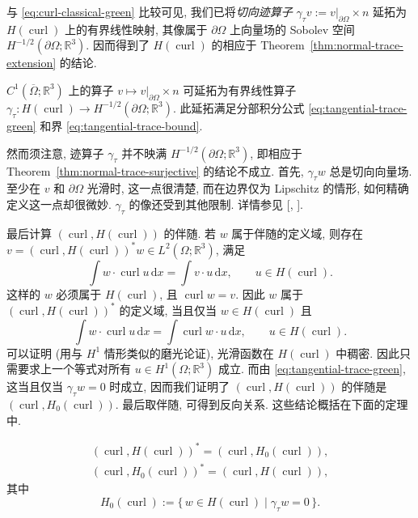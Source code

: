 与 \eqref{eq:curl-classical-green} 比较可见, 我们已将\emph{切向迹算子} $\gamma_\tau v:=v|_{\partial\Omega}\times n$ 延拓为 $H(\operatorname{curl})$ 上的有界线性映射, 其像属于 $\partial\Omega$ 上向量场的 Sobolev 空间 $H^{-1/2}(\partial\Omega;\mathbb R^3)$. 因而得到了 $H(\operatorname{curl})$ 的相应于 Theorem~\ref{thm:normal-trace-extension} 的结论.

\begin{Theorem}\label{thm:tangential-trace-extension}
$C^1(\overline\Omega;\mathbb R^3)$ 上的算子 $v\mapsto v|_{\partial\Omega}\times n$ 可延拓为有界线性算子 $\gamma_\tau:H(\operatorname{curl})\to H^{-1/2}(\partial\Omega;\mathbb R^3)$. 此延拓满足分部积分公式 \eqref{eq:tangential-trace-green} 和界 \eqref{eq:tangential-trace-bound}.
\end{Theorem}

然而须注意, 迹算子 $\gamma_\tau$ 并不映满 $H^{-1/2}(\partial\Omega;\mathbb R^3)$, 即相应于 Theorem~\ref{thm:normal-trace-surjective} 的结论不成立. 首先, $\gamma_\tau w$ 总是切向向量场. 至少在 $v$ 和 $\partial\Omega$ 光滑时, 这一点很清楚, 而在边界仅为 Lipschitz 的情形, 如何精确定义这一点却很微妙. $\gamma_\tau$ 的像还受到其他限制. 详情参见 [, ].

最后计算 $(\operatorname{curl},H(\operatorname{curl}))$ 的伴随. 若 $w$ 属于伴随的定义域, \newline 则存在 $v=(\operatorname{curl},H(\operatorname{curl}))^*w\in L^2(\Omega;\mathbb R^3)$, 满足
\[
\int w\cdot\operatorname{curl}u\,\mathrm{d}x=\int v\cdot u\,\mathrm{d}x,\qquad u\in H(\operatorname{curl}).
\]
这样的 $w$ 必须属于 $H(\operatorname{curl})$, 且 $\operatorname{curl}w=v$. 因此 $w$ 属于 $(\operatorname{curl},H(\operatorname{curl}))^*$ 的定义域, 当且仅当 $w\in H(\operatorname{curl})$ 且
\[
\int w\cdot\operatorname{curl}u\,\mathrm{d}x=\int\operatorname{curl}w\cdot u\,\mathrm{d}x,\qquad u\in H(\operatorname{curl}).
\]
可以证明 (用与 $H^1$ 情形类似的磨光论证), 光滑函数在 $H(\operatorname{curl})$ 中稠密. 因此只需要求上一个等式对所有 $u\in H^1(\Omega;\mathbb R^3)$ 成立. 而由 \eqref{eq:tangential-trace-green}, 这当且仅当 $\gamma_\tau w=0$ 时成立, 因而我们证明了 $(\operatorname{curl},H(\operatorname{curl}))$ 的伴随是 $(\operatorname{curl}, H_0(\operatorname{curl}))$. 最后取伴随, 可得到反向关系. 这些结论概括在下面的定理中.

\begin{Theorem}\label{thm:curl-adjoints}
\[
\begin{gathered}
(\operatorname{curl},H(\operatorname{curl}))^*=(\operatorname{curl}, H_0(\operatorname{curl})),\\
(\operatorname{curl}, H_0(\operatorname{curl}))^*=(\operatorname{curl},H(\operatorname{curl})),
\end{gathered}
\]
其中
\[
 H_0(\operatorname{curl}):=\{\,w\in H(\operatorname{curl})\mid\gamma_\tau w=0\,\}.
\]
\end{Theorem}

